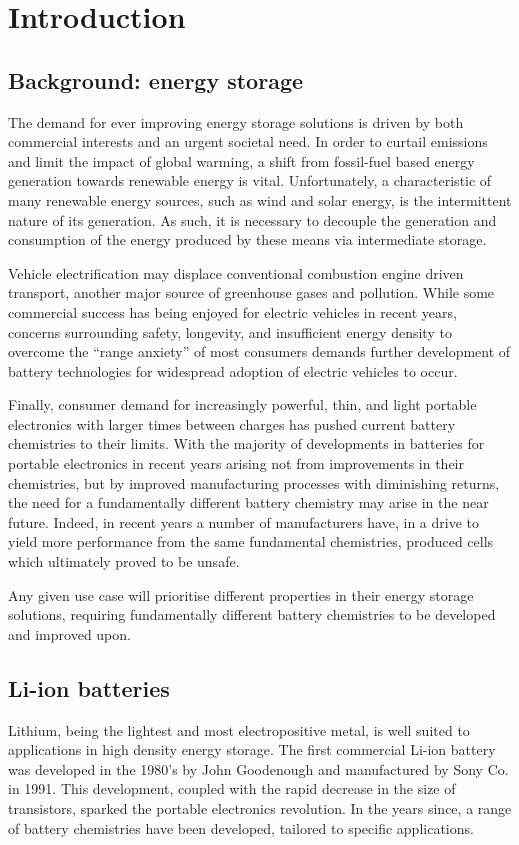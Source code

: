 \chapter{Introduction}
\section{Background: energy storage}
The demand for ever improving energy storage solutions is driven by both commercial interests and an urgent societal need.
In order to curtail  emissions and limit the impact of global warming, a shift from fossil-fuel based energy generation towards renewable energy is vital.\cite{Goodenough2013}
Unfortunately, a characteristic of many renewable energy sources, such as wind and solar energy, is the intermittent nature of its generation.\cite{Goodenough2010a,Ellis2012,Liu2013}
As such, it is necessary to decouple the generation and consumption of the energy produced by these means via intermediate storage.

Vehicle electrification may displace conventional combustion engine driven transport, another major source of greenhouse gases and pollution.\cite{Blomgren2017}
While some commercial success has being enjoyed for electric vehicles in recent years, concerns surrounding safety, longevity, and insufficient energy density to overcome the ``range anxiety'' of most consumers demands further development of battery technologies for widespread adoption of electric vehicles to occur.\cite{Cano2018a,Schmuch2018}

Finally, consumer demand for increasingly powerful, thin, and light portable electronics with larger times between charges has pushed current battery chemistries to their limits.\cite{Liu2010}
With the majority of developments in batteries for portable electronics in recent years arising not from improvements in their chemistries, but by improved manufacturing processes with diminishing returns, the need for a fundamentally different battery chemistry may arise in the near future.
Indeed, in recent years a number of manufacturers have, in a drive to yield more performance from the same fundamental chemistries, produced cells which ultimately proved to be unsafe.\cite{Loveridge2018}

Any given use case will prioritise different properties in their energy storage solutions, requiring fundamentally different battery chemistries to be developed and improved upon.

\section{Li-ion batteries}
\renewcommand{\thefootnote}{\fnsymbol{footnote}}
Lithium, being the lightest and most electropositive metal,\cite{Tarascon2010} is well suited to applications in high density energy storage.
The first commercial Li-ion battery was developed in the 1980's by John Goodenough\cite{Mizushima1981} and manufactured by Sony Co. in 1991.\cite{Li2018}
This development, coupled with the rapid decrease in the size of transistors, sparked the portable electronics revolution.
In the years since, a range of battery chemistries have been developed, tailored to specific applications.

